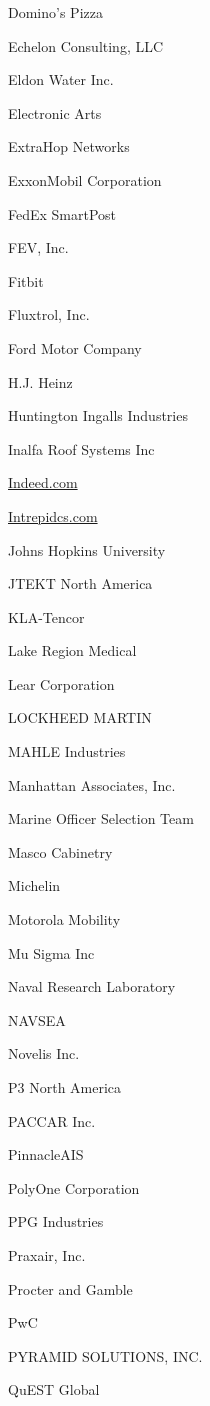 \documentclass[twoside]{article}
\begin{document}
\begin{center}
\begin{multicols}{5}
\begin{FlushLeft}
\begin{compactitem}
\item Domino's Pizza
\item Echelon Consulting, LLC
\item Eldon Water Inc.
\item Electronic Arts
\item ExtraHop Networks
\item ExxonMobil Corporation
\item FedEx SmartPost
\item FEV, Inc.
\item Fitbit
\item Fluxtrol, Inc.
\item Ford Motor Company
\item H.J. Heinz
\item Huntington Ingalls Industries
\item Inalfa Roof Systems Inc
\item \url{Indeed.com}
\item \url{Intrepidcs.com}
\item Johns Hopkins University
\item JTEKT North America
\item KLA-Tencor
\item Lake Region Medical
\item Lear Corporation
\item LOCKHEED MARTIN
\item MAHLE Industries
\item Manhattan Associates, Inc.
\item Marine Officer Selection Team
\item Masco Cabinetry
\item Michelin
\item Motorola Mobility
\item Mu Sigma Inc
\item Naval Research Laboratory
\item NAVSEA
\item Novelis Inc.
\item P3 North America
\item PACCAR Inc.
\item PinnacleAIS
\item PolyOne Corporation
\item PPG Industries
\item Praxair, Inc.
\item Procter and Gamble
\item PwC
\item PYRAMID SOLUTIONS, INC.
\item QuEST Global

\end{compactitem}
\end{FlushLeft}
\end{multicols}
\end{center}
\end{document}
